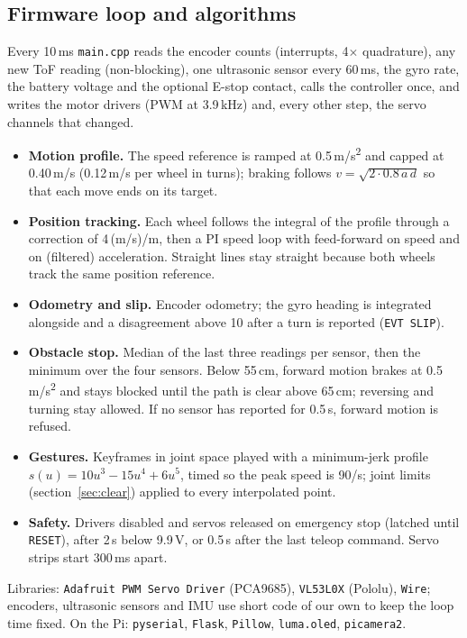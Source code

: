 \documentclass[11pt,a4paper]{article}
\newcommand{\file}[1]{{\small\nolinkurl{#1}}}
\renewcommand{\deg}{\textdegree}
\begin{document}
\subsection{Firmware loop and algorithms}
Every 10\,ms \file{main.cpp} reads the encoder counts (interrupts, 4$\times$ quadrature), any new ToF reading (non-blocking), one ultrasonic sensor every 60\,ms, the gyro rate, the battery voltage and the optional E-stop contact, calls the controller once, and writes the motor drivers (PWM at 3.9\,kHz) and, every other step, the servo channels that changed.
\begin{itemize}
\item \textbf{Motion profile.} The speed reference is ramped at 0.5\,m/s\textsuperscript{2} and capped at 0.40\,m/s (0.12\,m/s per wheel in turns); braking follows $v=\sqrt{2\cdot 0.8\,a\,d}$ so that each move ends on its target.
\item \textbf{Position tracking.} Each wheel follows the integral of the profile through a correction of 4\,(m/s)/m, then a PI speed loop with feed-forward on speed and on (filtered) acceleration. Straight lines stay straight because both wheels track the same position reference.
\item \textbf{Odometry and slip.} Encoder odometry; the gyro heading is integrated alongside and a disagreement above 10\deg{} after a turn is reported (\texttt{EVT SLIP}).
\item \textbf{Obstacle stop.} Median of the last three readings per sensor, then the minimum over the four sensors. Below 55\,cm, forward motion brakes at 0.5\,m/s\textsuperscript{2} and stays blocked until the path is clear above 65\,cm; reversing and turning stay allowed. If no sensor has reported for 0.5\,s, forward motion is refused.
\item \textbf{Gestures.} Keyframes in joint space played with a minimum-jerk profile $s(u)=10u^3-15u^4+6u^5$, timed so the peak speed is 90\deg/s; joint limits (section~\ref{sec:clear}) applied to every interpolated point.
\item \textbf{Safety.} Drivers disabled and servos released on emergency stop (latched until \texttt{RESET}), after 2\,s below 9.9\,V, or 0.5\,s after the last teleop command. Servo strips start 300\,ms apart.
\end{itemize}
Libraries: \texttt{Adafruit PWM Servo Driver} (PCA9685), \texttt{VL53L0X} (Pololu), \texttt{Wire}; encoders, ultrasonic sensors and IMU use short code of our own to keep the loop time fixed. On the Pi: \texttt{pyserial}, \texttt{Flask}, \texttt{Pillow}, \texttt{luma.oled}, \texttt{picamera2}.
\end{document}
